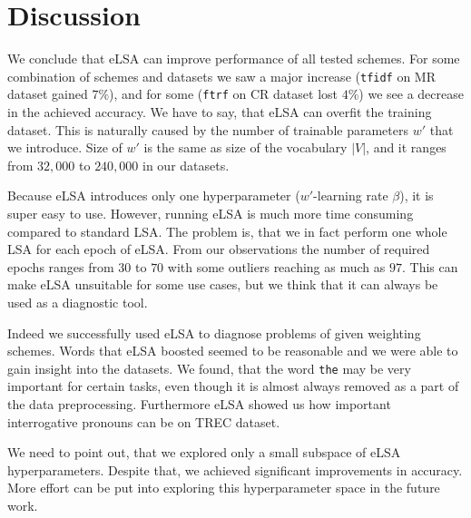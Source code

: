 \section{Discussion}


We conclude that eLSA can improve performance of all tested schemes.
For some combination of schemes and datasets we saw a major increase (\texttt{tfidf} on MR dataset gained $7\%$),
and for some (\texttt{ftrf} on CR dataset lost $4\%$) we see a decrease in the achieved accuracy.
We have to say, that eLSA can overfit the training dataset. 
This is naturally caused by the number of trainable parameters $w'$ that we introduce. 
Size of $w'$ is the same as size of the vocabulary $|V|$, and it ranges from $32,000$ to $240,000$ in our datasets.

Because eLSA introduces only one hyperparameter ($w'$-learning rate $\beta$), it is super easy to use. 
However, running eLSA is much more time consuming compared to standard LSA. 
The problem is, that we in fact perform one whole LSA for each epoch of eLSA.
From our observations the number of required epochs ranges from $30$ to  $70$ with some outliers reaching as much as $97$. 
This can make eLSA unsuitable for some use cases, but we think that it can always be used as a diagnostic tool.

Indeed we successfully used eLSA to diagnose problems of given weighting schemes.
Words that eLSA boosted seemed to be reasonable and we were able to gain insight into the datasets.
We found, that the word \texttt{the} may be very important for certain tasks, even though it is almost always removed as a part of the data preprocessing. 
Furthermore eLSA showed us how important interrogative pronouns can be on TREC dataset.

We need to point out, that we explored only a small subspace of eLSA hyperparameters. 
Despite that, we achieved significant improvements in accuracy.
More effort can be put into exploring this hyperparameter space in the future work.